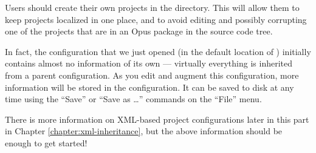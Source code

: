 Users should create their own projects in the 
directory.  This will allow them to keep projects localized in one place,
and to avoid editing and possibly corrupting one of the projects that are
in an Opus package in the source code tree.

In fact, the  configuration that we just opened
(in the default location of ) initially contains
almost no information of its own --- virtually everything is inherited from
a parent configuration.  As you edit and augment this configuration, more
information will be stored in the configuration.  It can be saved to disk
at any time using the ``Save'' or ``Save as \ldots'' commands on the
``File'' menu.

There is more information on XML-based project configurations later in this part
in Chapter \ref{chapter:xml-inheritance}, but the above information
should be enough to get started!

